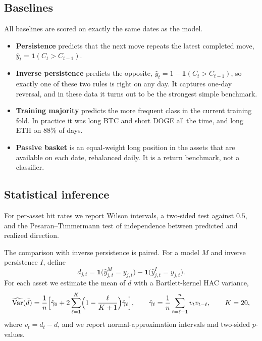 \documentclass[preprint,12pt,authoryear,a4paper]{elsarticle}
\begin{document}
\subsection{Baselines}

All baselines are scored on exactly the same dates as the model.
\begin{itemize}
\item \textbf{Persistence} predicts that the next move repeats the latest completed
move, $\hat y_t=\mathbf{1}(C_t>C_{t-1})$.
\item \textbf{Inverse persistence} predicts the opposite,
$\hat y_t=1-\mathbf{1}(C_t>C_{t-1})$, so exactly one of these two rules is right on
any day. It captures one-day reversal, and in these data it turns out to be the
strongest simple benchmark.
\item \textbf{Training majority} predicts the more frequent class in the current
training fold. In practice it was long BTC and short DOGE all the time, and long
ETH on $88\%$ of days.
\item \textbf{Passive basket} is an equal-weight long position in the assets that
are available on each date, rebalanced daily. It is a return benchmark, not a
classifier.
\end{itemize}

\subsection{Statistical inference}\label{ssec:inference}

For per-asset hit rates we report Wilson intervals, a two-sided test against
$0.5$, and the Pesaran--Timmermann test of independence between predicted and
realized direction.

The comparison with inverse persistence is paired. For a model $M$ and inverse
persistence $I$, define
\begin{equation}
d_{j,t}=\mathbf{1}\bigl(\hat y^{M}_{j,t}=y_{j,t}\bigr)-\mathbf{1}\bigl(\hat y^{I}_{j,t}=y_{j,t}\bigr).
\label{eq:diff}
\end{equation}
For each asset we estimate the mean of $d$ with a Bartlett-kernel HAC variance,
\begin{equation}
\widehat{\operatorname{Var}}(\bar d)=\frac{1}{n}\Bigl[\hat\gamma_0+2\sum_{\ell=1}^{K}\Bigl(1-\frac{\ell}{K+1}\Bigr)\hat\gamma_\ell\Bigr],
\qquad
\hat\gamma_\ell=\frac{1}{n}\sum_{t=\ell+1}^{n}v_t v_{t-\ell},
\qquad K=20,
\label{eq:hac}
\end{equation}
where $v_t=d_t-\bar d$, and we report normal-approximation intervals and two-sided
$p$-values.
\end{document}
